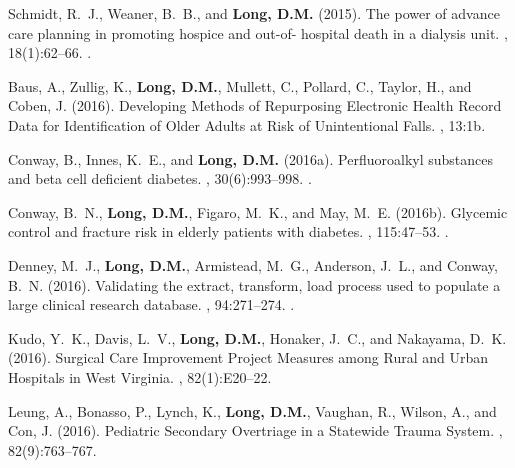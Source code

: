 \begin{thebibliography}{}
Schmidt, R.~J., Weaner, B.~B., and \textbf{Long, D.M.} (2015).
\newblock The power of advance care planning in promoting hospice and out-of-
  hospital death in a dialysis unit.
, 18(1):62--66.
.  


Baus, A., Zullig, K., \textbf{Long, D.M.}, Mullett, C., Pollard, C., Taylor, H., and
  Coben, J. (2016).
\newblock Developing {Methods} of {Repurposing} {Electronic} {Health} {Record}
  {Data} for {Identification} of {Older} {Adults} at {Risk} of {Unintentional}
  {Falls}.
, 13:1b.
  


Conway, B., Innes, K.~E., and \textbf{Long, D.M.} (2016a).
\newblock Perfluoroalkyl substances and beta cell deficient diabetes.
, 30(6):993--998.
.  


Conway, B.~N., \textbf{Long, D.M.}, Figaro, M.~K., and May, M.~E. (2016b).
\newblock Glycemic control and fracture risk in elderly patients with diabetes.
, 115:47--53.
.  


Denney, M.~J., \textbf{Long, D.M.}, Armistead, M.~G., Anderson, J.~L., and Conway,
  B.~N. (2016).
\newblock Validating the extract, transform, load process used to populate a
  large clinical research database.
, 94:271--274.
.  



Kudo, Y.~K., Davis, L.~V., \textbf{Long, D.M.}, Honaker, J.~C., and Nakayama, D.~K.
  (2016).
\newblock Surgical {Care} {Improvement} {Project} {Measures} among {Rural} and
  {Urban} {Hospitals} in {West} {Virginia}.
, 82(1):E20--22.
  


Leung, A., Bonasso, P., Lynch, K., \textbf{Long, D.M.}, Vaughan, R., Wilson, A., and Con,
  J. (2016).
\newblock Pediatric {Secondary} {Overtriage} in a {Statewide} {Trauma}
  {System}.
, 82(9):763--767.



\end{thebibliography}
